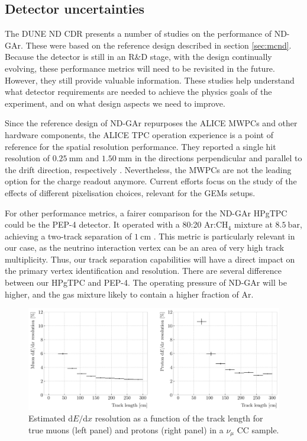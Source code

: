 \subsection{Detector uncertainties}

The DUNE ND CDR \cite{DUNE2021NDCDR} presents a number of studies on the performance of ND-GAr. These were based on the reference design described in section \ref{sec:mcnd}. Because the detector is still in an R\&D stage, with the design continually evolving, these performance metrics will need to be revisited in the future. However, they still provide valuable information. These studies help understand what detector requirements are needed to achieve the physics goals of the experiment, and on what design aspects we need to improve.

Since the reference design of ND-GAr repurposes the ALICE MWPCs and other hardware components, the ALICE TPC operation experience is a point of reference for the spatial resolution performance. They reported a single hit resolution of $0.25~\mathrm{mm}$ and $1.50~\mathrm{mm}$ in the directions perpendicular and parallel to the drift direction, respectively \cite{ALICE2006}. Nevertheless, the MWPCs are not the leading option for the charge readout anymore. Current efforts focus on the study of the effects of different pixelisation choices, relevant for the GEMs setups.

For other performance metrics, a fairer comparison for the ND-GAr HPgTPC could be the PEP-4 detector. It operated with a 80:20 $\mathrm{Ar}$:$\mathrm{CH}_{4}$ mixture at $8.5~\mathrm{bar}$, achieving a two-track separation of $1~\mathrm{cm}$ \cite{Stork1982,Aihara1983}. This metric is particularly relevant in our case, as the neutrino interaction vertex can be an area of very high track multiplicity. Thus, our track separation capabilities will have a direct impact on the primary vertex identification and resolution. There are several difference between our HPgTPC and PEP-4. The operating pressure of ND-GAr will be higher, and the gas mixture likely to contain a higher fraction of Ar.

\begin{figure}[t]
    \centering
    \includegraphics[width=.90\linewidth]{Images/GAr_selection/length_dEdx_resolution_vs_length.pdf}
    \caption[Estimated $\mathrm{d}E/\mathrm{d}x$ resolution as a function of the track length for true muons and protons in a $\nu_{\mu}$ CC sample.]{Estimated $\mathrm{d}E/\mathrm{d}x$ resolution as a function of the track length for true muons (left panel) and protons (right panel) in a $\nu_{\mu}$ CC sample.}
    \label{fig:dEdx_resolution_vs_length}
\end{figure}

